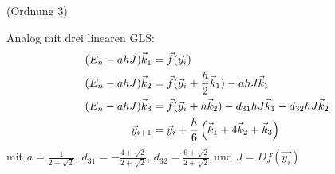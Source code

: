 \vspace{1\baselineskip}

 (Ordnung 3)

Analog mit drei linearen GLS:
\begin{align*}
    (E_n - a h J) \vec{k}_1 &= \vec{f} (\vec{y}_i) \\
    (E_n - a h J) \vec{k}_2 &= \vec{f} (\vec{y}_i + \frac{h}{2} \vec{k}_1) - a h J \vec{k}_1 \\
    (E_n - a h J) \vec{k}_3 &= \vec{f} (\vec{y}_i + h \vec{k}_2) - d_{31} h J \vec{k}_1 - d_{32} h J \vec{k}_2 \\
    \vec{y}_{i+1} &= \vec{y}_i + \frac{h}{6} \left( \vec{k}_1 + 4 \vec{k}_2 + \vec{k}_3 \right)
\end{align*}
mit $a = \frac{1}{2 + \sqrt{2}}$, $d_{31} = - \frac{4+ \sqrt{2}}{2 + \sqrt{2}}$,
$d_{32} = \frac{6+ \sqrt{2}}{2 + \sqrt{2}}$ und $J = Df(\vec{y_i})$
